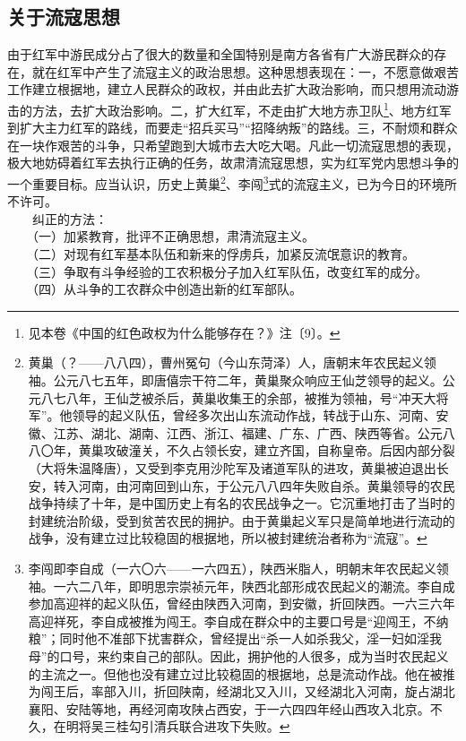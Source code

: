 \documentclass[cn,11pt,chinese]{elegantbook}
\def\myformat#1{\hfil\hfil #1}
\begin{document}
\subsection*{\myformat{关于流寇思想}}
由于红军中游民成分占了很大的数量和全国特别是南方各省有广大游民群众的存在，就在红军中产生了流寇主义的政治思想。这种思想表现在：一，不愿意做艰苦工作建立根据地，建立人民群众的政权，并由此去扩大政治影响，而只想用流动游击的方法，去扩大政治影响。二，扩大红军，不走由扩大地方赤卫队\footnote[3]{ 见本卷《中国的红色政权为什么能够存在？》注〔9〕。}、地方红军到扩大主力红军的路线，而要走“招兵买马”“招降纳叛”的路线。三，不耐烦和群众在一块作艰苦的斗争，只希望跑到大城市去大吃大喝。凡此一切流寇思想的表现，极大地妨碍着红军去执行正确的任务，故肃清流寇思想，实为红军党内思想斗争的一个重要目标。应当认识，历史上黄巢\footnote[4]{ 黄巢（？——八八四），曹州冤句（今山东菏泽）人，唐朝末年农民起义领袖。公元八七五年，即唐僖宗干符二年，黄巢聚众响应王仙芝领导的起义。公元八七八年，王仙芝被杀后，黄巢收集王的余部，被推为领袖，号“冲天大将军”。他领导的起义队伍，曾经多次出山东流动作战，转战于山东、河南、安徽、江苏、湖北、湖南、江西、浙江、福建、广东、广西、陕西等省。公元八八〇年，黄巢攻破潼关，不久占领长安，建立齐国，自称皇帝。后因内部分裂（大将朱温降唐），又受到李克用沙陀军及诸道军队的进攻，黄巢被迫退出长安，转入河南，由河南回到山东，于公元八八四年失败自杀。黄巢领导的农民战争持续了十年，是中国历史上有名的农民战争之一。它沉重地打击了当时的封建统治阶级，受到贫苦农民的拥护。由于黄巢起义军只是简单地进行流动的战争，没有建立过比较稳固的根据地，所以被封建统治者称为“流寇”。}、李闯\footnote[5]{ 李闯即李自成（一六〇六——一六四五），陕西米脂人，明朝末年农民起义领袖。一六二八年，即明思宗崇祯元年，陕西北部形成农民起义的潮流。李自成参加高迎祥的起义队伍，曾经由陕西入河南，到安徽，折回陕西。一六三六年高迎祥死，李自成被推为闯王。李自成在群众中的主要口号是“迎闯王，不纳粮”；同时他不准部下扰害群众，曾经提出“杀一人如杀我父，淫一妇如淫我母”的口号，来约束自己的部队。因此，拥护他的人很多，成为当时农民起义的主流之一。但他也没有建立过比较稳固的根据地，总是流动作战。他在被推为闯王后，率部入川，折回陕南，经湖北又入川，又经湖北入河南，旋占湖北襄阳、安陆等地，再经河南攻陕占西安，于一六四四年经山西攻入北京。不久，在明将吴三桂勾引清兵联合进攻下失败。}式的流寇主义，已为今日的环境所不许可。\\
　　纠正的方法：\\
　　（一）加紧教育，批评不正确思想，肃清流寇主义。\\
　　（二）对现有红军基本队伍和新来的俘虏兵，加紧反流氓意识的教育。\\
　　（三）争取有斗争经验的工农积极分子加入红军队伍，改变红军的成分。\\
　　（四）从斗争的工农群众中创造出新的红军部队。\\
\end{document}
